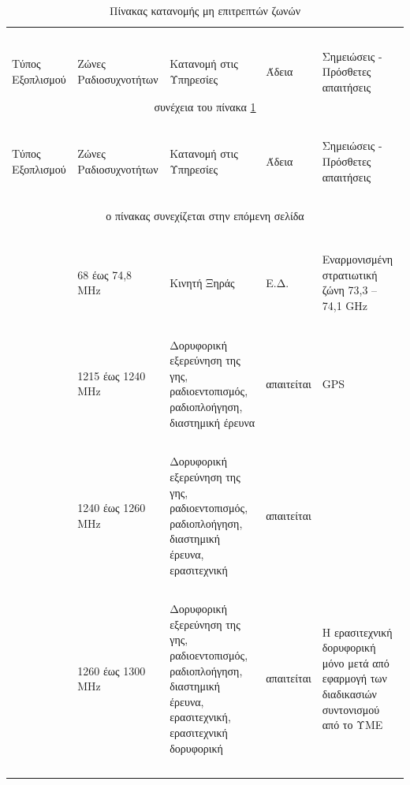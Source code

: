 \documentclass[a4paper, 12pt, twoside]{report}
\begin{document}
{{{{{{			\begin{landscape}	
				\setlength\LTleft{0pt}            %
				\setlength\LTright{0pt}           %
			
			\begin{longtable} { m{3cm} m{4cm} m{4cm} m{3cm} m{5cm} }
					\caption[Πίνακας κατανομής μη επιτρεπτών ζωνών \cite{ΦΕΚ2006Β399, ΦΕΚ2011Β2512}]{Πίνακας κατανομής μη επιτρεπτών ζωνών}
					\label{πιν.:Πίνακας κατανομής μη επιτρεπτών ζωνών}\\
					\hline
					~\\
					Τύπος Εξοπλισμού & Ζώνες Ραδιοσυχνοτήτων & Κατανομή στις Υπηρεσίες & Άδεια & Σημειώσεις - Πρόσθετες απαιτήσεις\\
					\hline
					\endfirsthead
					\multicolumn{5}{c}{συνέχεια του πίνακα \ref{πιν.:Πίνακας κατανομής μη επιτρεπτών ζωνών}}\\
					\hline
					~\\
					Τύπος Εξοπλισμού & Ζώνες Ραδιοσυχνοτήτων & Κατανομή στις Υπηρεσίες & Άδεια & Σημειώσεις - Πρόσθετες απαιτήσεις\\
					\hline
					~\\
					\endhead
					\hline
					\multicolumn{5}{c}{ο πίνακας συνεχίζεται στην επόμενη σελίδα}\\
					\endfoot
					\multicolumn{5}{c}{ολοκληρώθηκε ο πίνακας \ref{πιν.:Πίνακας κατανομής μη ελεύθερων ζωνών}}\\
					\endlastfoot
					~\\
					& 68 έως 74,8 MHz & Κινητή Ξηράς & Ε.Δ. & Εναρμονισμένη στρατιωτική ζώνη 73,3 – 74,1 GHz\\
					\hdashline
					~\\
					& 1215 έως 1240 MHz & Δορυφορική εξερεύνηση της γης, ραδιοεντοπισμός, ραδιοπλοήγηση, διαστημική έρευνα & απαιτείται & GPS\\
					\hdashline
					~\\
					& 1240 έως 1260 MHz & Δορυφορική εξερεύνηση της γης, ραδιοεντοπισμός, ραδιοπλοήγηση, διαστημική έρευνα, ερασιτεχνική & απαιτείται & \\
					\hdashline
					~\\
					& 1260 έως 1300 MHz & Δορυφορική εξερεύνηση της γης, ραδιοεντοπισμός, ραδιοπλοήγηση, διαστημική έρευνα, ερασιτεχνική, ερασιτεχνική δορυφορική & απαιτείται & Η ερασιτεχνική δορυφορική μόνο μετά από εφαρμογή των διαδικασιών συντονισμού από το ΥΜΕ\\
					\hdashline
					~\\

\end{longtable}
\end{landscape}}}}}}}
\end{document}
